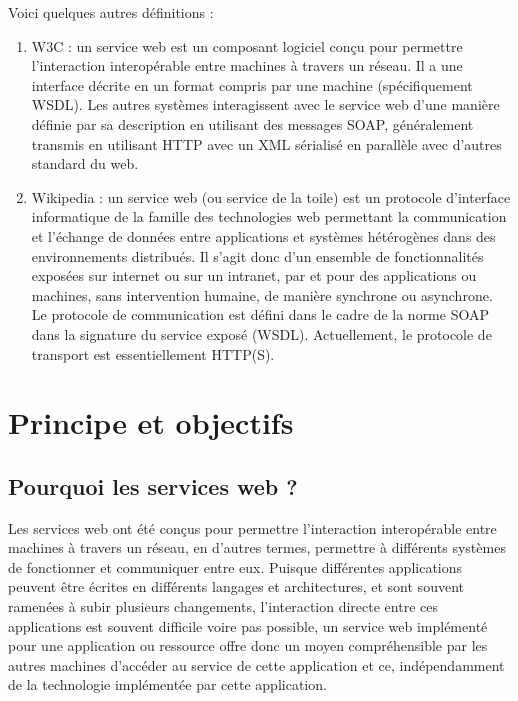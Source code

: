 Voici quelques autres définitions :
\begin{enumerate}
	\item W3C :
	      un service web est un composant logiciel conçu pour permettre l'interaction interopérable entre machines à travers un réseau. Il a une interface décrite en un format compris par une machine (spécifiquement WSDL). Les autres systèmes interagissent avec le service web d'une manière définie par sa description en utilisant des messages SOAP, généralement transmis en utilisant HTTP avec un XML sérialisé en parallèle avec d'autres standard du web\cite{W3}.
	\item Wikipedia : un service web (ou service de la toile) est un protocole d'interface informatique de la famille des technologies web permettant la communication et l'échange de données entre applications et systèmes hétérogènes dans des environnements distribués. Il s'agit donc d'un ensemble de fonctionnalités exposées sur internet ou sur un intranet, par et pour des applications ou machines, sans intervention humaine, de manière synchrone ou asynchrone. Le protocole de communication est défini dans le cadre de la norme SOAP dans la signature du service exposé (WSDL). Actuellement, le protocole de transport est essentiellement HTTP(S).
\end{enumerate}

\section{Principe et objectifs}
\subsection{Pourquoi les services web ?}
Les services web ont été conçus pour permettre l'interaction interopérable entre machines à travers un réseau, en d'autres termes, permettre à différents systèmes de fonctionner et communiquer entre eux.\newline
Puisque différentes applications peuvent être écrites en différents langages et architectures, et sont souvent ramenées à subir plusieurs changements, l’interaction directe entre ces applications est souvent difficile voire pas possible, un service web implémenté pour une application ou ressource offre donc un moyen compréhensible par les autres machines d'accéder au service de cette application et ce, indépendamment de la technologie implémentée par cette application\cite{refTutorialPointsWS}.

